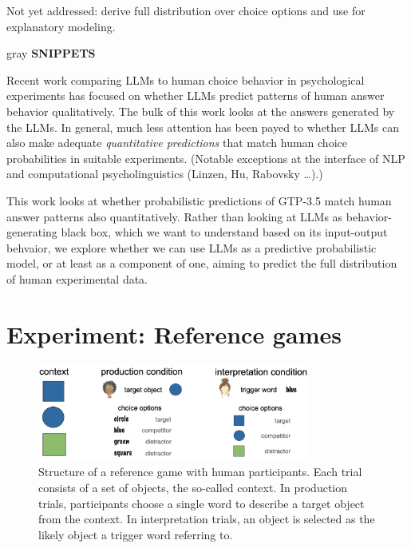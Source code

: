 \documentclass{article}
\begin{document}
Not yet addressed: derive full distribution over choice options and use for explanatory modeling.

\bigskip

\begin{color}{gray}
\textbf{SNIPPETS}

Recent work comparing LLMs to human choice behavior in psychological experiments has focused on whether LLMs predict patterns of human answer behavior qualitatively.
The bulk of this work looks at the answers generated by the LLMs.
In general, much less attention has been payed to whether LLMs can also make adequate \emph{quantitative predictions} that match human choice probabilities in suitable experiments.
(Notable exceptions at the interface of NLP and computational psycholinguistics (Linzen, Hu, Rabovsky \ldots).)

This work looks at whether probabilistic predictions of GTP-3.5 match human answer patterns also quantitatively.
Rather than looking at LLMs as behavior-generating black box, which we want to understand based on its input-output behvaior, we explore whether we can use LLMs as a predictive probabilistic model, or at least as a component of one, aiming to predict the full distribution of human experimental data.
\end{color}


\section{Experiment: Reference games}
\label{experiment-reference-games}

\begin{figure}
  \centering

  \includegraphics[width = 0.8\textwidth]{00-pics/reference-game.png}

  \caption{Structure of a reference game with human participants. Each trial consists of a set of objects, the so-called context. In production trials, participants choose a single word to describe a target object from the context. In interpretation trials, an object is selected as the likely object a trigger word referring to.}
  \label{fig:ref-game}
\end{figure}
\end{document}
